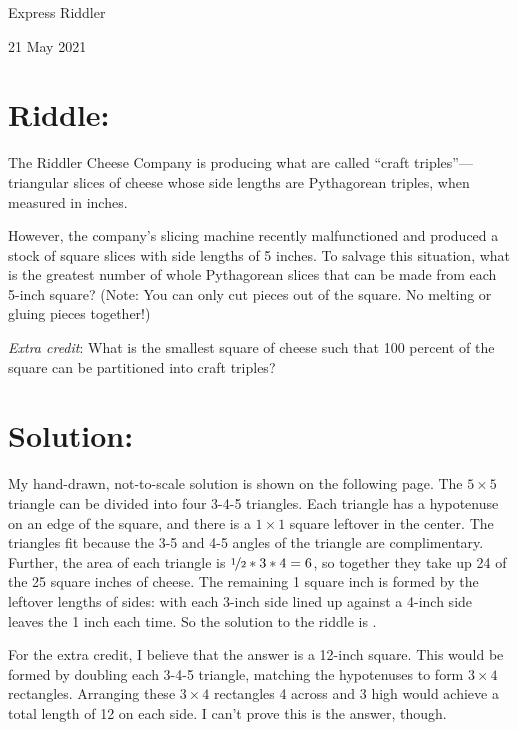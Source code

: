 \documentclass{article}
\begin{document}
\pagestyle{empty} %

\begin{center}
{\LARGE Express Riddler}

\vspace{0.15in}

{\Large 21 May 2021}
\end{center}


\section*{Riddle:}

The Riddler Cheese Company is producing what are called ``craft triples''---triangular slices of cheese whose side lengths are Pythagorean triples, when measured in inches.

However, the company's slicing machine recently malfunctioned and produced a stock of square slices with side lengths of 5 inches.
To salvage this situation, what is the greatest number of whole Pythagorean slices that can be made from each 5-inch square?
(Note: You can only cut pieces out of the square.
No melting or gluing pieces together!)

\textit{Extra credit}: What is the smallest square of cheese such that 100 percent of the square can be partitioned into craft triples?



\section*{Solution:}

My hand-drawn, not-to-scale solution is shown on the following page.
The $5\times5$ triangle can be divided into four 3-4-5 triangles.
Each triangle has a hypotenuse on an edge of the square, and there is a $1\times1$ square leftover in the center.
The triangles fit because the 3-5 and 4-5 angles of the triangle are complimentary.
Further, the area of each triangle is $\nicefrac{1}{2}*3*4=6$, so together they take up 24 of the 25 square inches of cheese.
The remaining 1 square inch is formed by the leftover lengths of sides: with each 3-inch side lined up against a 4-inch side leaves the 1 inch each time.
So the solution to the riddle is
.

For the extra credit, I believe that the answer is a 12-inch square.
This would be formed by doubling each 3-4-5 triangle, matching the hypotenuses to form $3\times4$ rectangles.
Arranging these $3\times4$ rectangles 4 across and 3 high would achieve a total length of 12 on each side.
I can't prove this is the answer, though.
\end{document}
